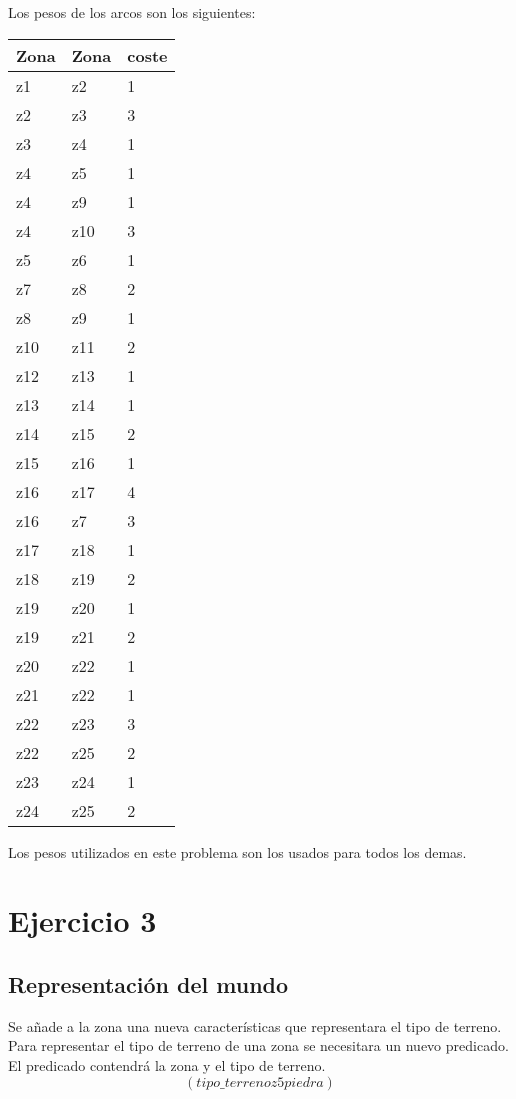 \documentclass[]{article}
\begin{document}
Los pesos de los arcos son los siguientes:
\begin{table}[htbp]
	\begin{center}
		\begin{tabular}{|l|l|l|}
			\hline
			Zona & Zona & coste \\
			\hline \hline
			z1 & z2 & 1 \\ \hline
			z2 & z3 & 3 \\ \hline
			z3 & z4 & 1 \\ \hline
			z4 & z5 & 1 \\ \hline
			z4 & z9 & 1 \\ \hline
			z4 & z10 & 3  \\ \hline
			z5 & z6 & 1 \\ \hline
			z7 & z8 & 2 \\ \hline
			z8 & z9 & 1 \\ \hline
			z10 & z11 & 2 \\ \hline
			z12 & z13 & 1 \\ \hline
			z13 & z14 & 1 \\ \hline
			z14 & z15 & 2 \\ \hline
			z15 & z16 & 1 \\ \hline
			z16 & z17 & 4 \\ \hline
			z16 & z7 & 3 \\ \hline
			z17 & z18 & 1 \\ \hline
			z18 & z19 & 2 \\ \hline
			z19 & z20 & 1 \\ \hline
			z19 & z21 & 2 \\ \hline
			z20 & z22 & 1 \\ \hline
			z21 & z22 & 1 \\ \hline
			z22 & z23 & 3 \\ \hline
			z22 & z25 & 2 \\ \hline
			z23 & z24 & 1 \\ \hline
			z24 & z25 & 2 \\ \hline
			
			
			
			
		\end{tabular}
	\end{center}
\end{table}
 Los pesos utilizados en este problema son los usados para todos los demas. 
\section{Ejercicio 3}
\subsection{Representación del mundo}
Se añade a la zona una nueva características que representara el tipo de terreno. Para representar el tipo de terreno de una zona se necesitara un nuevo predicado. El predicado contendrá la zona y el tipo de terreno. 
$$
(tipo\_terreno z5 piedra)
$$
\end{document}
